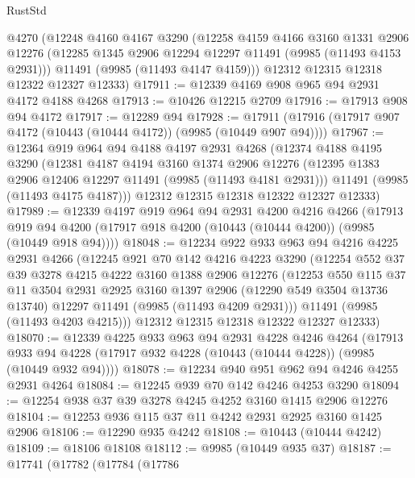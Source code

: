 \begin{lexlean}{RustStd}
\begin{coremodule}
    @4270
    (@12248
      @4160
      @4167
      @3290
      (@12258
        @4159
        @4166
        @3160
        @1331
        @2906
        @12276
        (@12285 @1345 @2906 @12294 @12297 @11491 (@9985 (@11493 @4153 @2931)))
        @11491
        (@9985 (@11493 @4147 @4159)))
      @12312
      @12315
      @12318
      @12322
      @12327
      @12333)
@17911 := @12339 @4169 @908 @965 @94 @2931 @4172 @4188 @4268
@17913 := @10426 @12215 @2709
@17916 := @17913 @908 @94 @4172
@17917 := @12289 @94
@17928 := @17911 (@17916 (@17917 @907 @4172 (@10443 (@10444 @4172)) (@9985 (@10449 @907 @94))))
@17967 := @12364
    @919
    @964
    @94
    @4188
    @4197
    @2931
    @4268
    (@12374
      @4188
      @4195
      @3290
      (@12381
        @4187
        @4194
        @3160
        @1374
        @2906
        @12276
        (@12395 @1383 @2906 @12406 @12297 @11491 (@9985 (@11493 @4181 @2931)))
        @11491
        (@9985 (@11493 @4175 @4187)))
      @12312
      @12315
      @12318
      @12322
      @12327
      @12333)
@17989 := @12339
    @4197
    @919
    @964
    @94
    @2931
    @4200
    @4216
    @4266
    (@17913 @919 @94 @4200 (@17917 @918 @4200 (@10443 (@10444 @4200)) (@9985 (@10449 @918 @94))))
@18048 := @12234
    @922
    @933
    @963
    @94
    @4216
    @4225
    @2931
    @4266
    (@12245
      @921
      @70
      @142
      @4216
      @4223
      @3290
      (@12254
        @552
        @37
        @39
        @3278
        @4215
        @4222
        @3160
        @1388
        @2906
        @12276
        (@12253
          @550
          @115
          @37
          @11
          @3504
          @2931
          @2925
          @3160
          @1397
          @2906
          (@12290 @549 @3504 @13736 @13740)
          @12297
          @11491
          (@9985 (@11493 @4209 @2931)))
        @11491
        (@9985 (@11493 @4203 @4215)))
      @12312
      @12315
      @12318
      @12322
      @12327
      @12333)
@18070 := @12339
    @4225
    @933
    @963
    @94
    @2931
    @4228
    @4246
    @4264
    (@17913 @933 @94 @4228 (@17917 @932 @4228 (@10443 (@10444 @4228)) (@9985 (@10449 @932 @94))))
@18078 := @12234 @940 @951 @962 @94 @4246 @4255 @2931 @4264
@18084 := @12245 @939 @70 @142 @4246 @4253 @3290
@18094 := @12254 @938 @37 @39 @3278 @4245 @4252 @3160 @1415 @2906 @12276
@18104 := @12253 @936 @115 @37 @11 @4242 @2931 @2925 @3160 @1425 @2906
@18106 := @12290 @935 @4242
@18108 := @10443 (@10444 @4242)
@18109 := @18106 @18108
@18112 := @9985 (@10449 @935 @37)
@18187 := @17741
    (@17782
      (@17784
        (@17786

\end{coremodule}
\end{lexlean}
